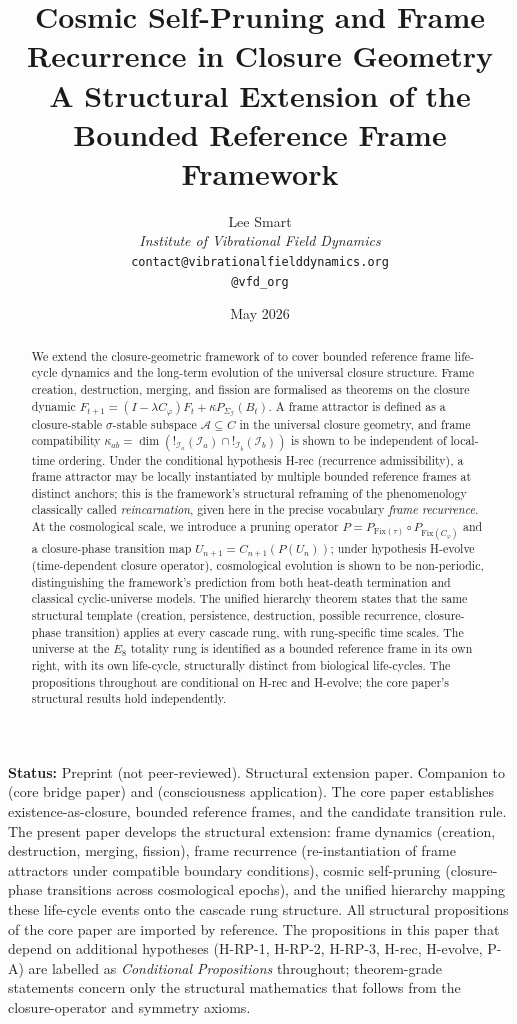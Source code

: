 \documentclass[11pt]{article}
\title{Cosmic Self-Pruning and Frame Recurrence in Closure Geometry\\[6pt]
\large A Structural Extension of the Bounded Reference Frame Framework}
\author{%
  Lee Smart\\[4pt]
  \textit{Institute of Vibrational Field Dynamics}\\[2pt]
  \texttt{contact@vibrationalfielddynamics.org}\\[2pt]
  \texttt{@vfd\_org}%
}
\date{May 2026}
\theoremstyle{plain}
\theoremstyle{definition}
\theoremstyle{remark}
\newcommand{\Fix}{\mathrm{Fix}}
\newcommand{\Ical}{\mathcal{I}}
\newcommand{\Cph}{C_\varphi}
\begin{document}
\maketitle

\noindent\textbf{Status:} Preprint (not peer-reviewed). Structural extension paper. Companion to \citet{SmartExistenceClosure} (core bridge paper) and \citet{SmartProcessingToPOV} (consciousness application). The core paper establishes existence-as-closure, bounded reference frames, and the candidate transition rule. The present paper develops the structural extension: frame dynamics (creation, destruction, merging, fission), frame recurrence (re-instantiation of frame attractors under compatible boundary conditions), cosmic self-pruning (closure-phase transitions across cosmological epochs), and the unified hierarchy mapping these life-cycle events onto the cascade rung structure. All structural propositions of the core paper are imported by reference. The propositions in this paper that depend on additional hypotheses (H-RP-1, H-RP-2, H-RP-3, H-rec, H-evolve, P-A) are labelled as \emph{Conditional Propositions} throughout; theorem-grade statements concern only the structural mathematics that follows from the closure-operator and symmetry axioms.

\begin{abstract}
We extend the closure-geometric framework of \citet{SmartExistenceClosure} to cover bounded reference frame life-cycle dynamics and the long-term evolution of the universal closure structure. Frame creation, destruction, merging, and fission are formalised as theorems on the closure dynamic $F_{t+1} = (I - \lambda \Cph) F_t + \kappa P_{\Sigma_\Ical}(B_t)$. A frame attractor is defined as a closure-stable $\sigma$-stable subspace $\mathcal{A} \subseteq C$ in the universal closure geometry, and frame compatibility $\kappa_{ab} = \dim(!_{\Ical_a}(\Ical_a) \cap !_{\Ical_b}(\Ical_b))$ is shown to be independent of local-time ordering. Under the conditional hypothesis H-rec (recurrence admissibility), a frame attractor may be locally instantiated by multiple bounded reference frames at distinct anchors; this is the framework's structural reframing of the phenomenology classically called \emph{reincarnation}, given here in the precise vocabulary \emph{frame recurrence}. At the cosmological scale, we introduce a pruning operator $P = P_{\Fix(\tau)} \circ P_{\Fix(\Cph)}$ and a closure-phase transition map $U_{n+1} = C_{n+1}(P(U_n))$; under hypothesis H-evolve (time-dependent closure operator), cosmological evolution is shown to be non-periodic, distinguishing the framework's prediction from both heat-death termination and classical cyclic-universe models. The unified hierarchy theorem states that the same structural template (creation, persistence, destruction, possible recurrence, closure-phase transition) applies at every cascade rung, with rung-specific time scales. The universe at the $E_8$ totality rung is identified as a bounded reference frame in its own right, with its own life-cycle, structurally distinct from biological life-cycles. The propositions throughout are conditional on H-rec and H-evolve; the core paper's structural results hold independently.
\end{abstract}
\end{document}
